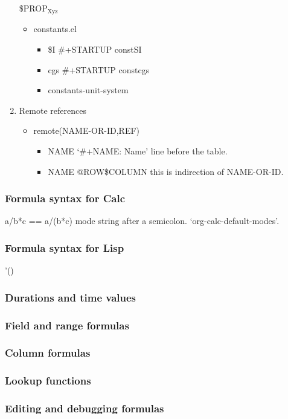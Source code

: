 \documentclass[11pt]{article}
\begin{document}
\begin{enumerate}
\$PROP\(_{\text{Xyz}}\)
\begin{itemize}
\item constants.el
\begin{itemize}
\item \$I \#+STARTUP  constSI
\item cgs \#+STARTUP  constcgs
\item constants-unit-system
\end{itemize}
\end{itemize}
\item Remote references
\label{sec:orgd9d132f}
\begin{itemize}
\item remote(NAME-OR-ID,REF)
\begin{itemize}
\item NAME ‘\#+NAME: Name’ line before the table.
\item NAME @ROW\$COLUMN    this is indirection of NAME-OR-ID.
\end{itemize}
\end{itemize}
\end{enumerate}
\subsubsection{Formula syntax for Calc}
\label{sec:org0dac23f}
a/b*c  ==  a/(b*c)
mode string after a semicolon.
‘org-calc-default-modes’.
\subsubsection{Formula syntax for Lisp}
\label{sec:orgb50ecd8}
'()
\subsubsection{Durations and time values}
\label{sec:orgb2b0f73}
\subsubsection{Field and range formulas}
\label{sec:org19fd4e8}
\subsubsection{Column formulas}
\label{sec:org18998f7}
\subsubsection{Lookup functions}
\label{sec:orge06a89b}
\subsubsection{Editing and debugging formulas}
\label{sec:org89143ff}
\end{document}
